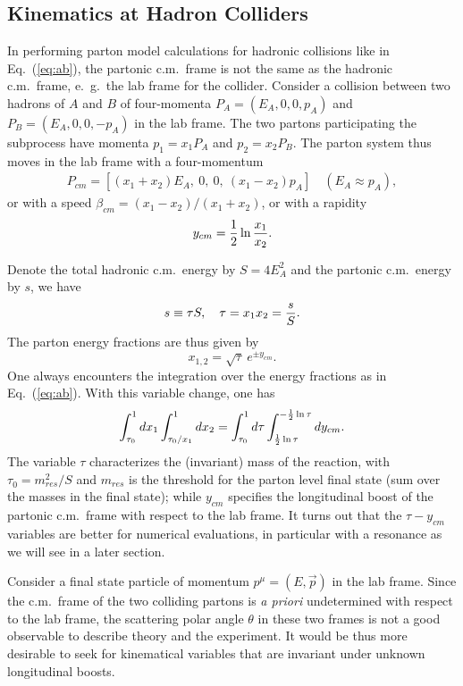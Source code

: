 \documentclass[prd,aps,floats,preprintnumbers,preprint,superscriptaddress,floatfix,nofootinbib]{revtex4}
\def\be{\begin{equation}}
\def\ee{\end{equation}}
\def\bea{\begin{eqnarray}}
\def\eea{\end{eqnarray}}
\begin{document}
\subsection{Kinematics at Hadron Colliders}

In performing parton model calculations for hadronic collisions like in 
Eq.~(\ref{eq:ab}), the partonic c.m.~frame is not the same as the hadronic
c.m.~frame, {e.~g.}~the lab frame for the collider. 
Consider a collision between two hadrons of $A$ and $B$
of four-momenta $P_A=(E_A^{},0,0,p_A^{})$ and $P_B=(E_A^{},0,0,-p_A^{})$ 
in the lab frame. The two partons participating 
the subprocess have momenta $p_1=x_1 P_A^{}$ and $p_2=x_2 P_B^{}$.
The parton system thus moves in the lab frame with a four-momentum 
\bea
P_{cm}=[(x_1+x_2)E_A^{},\ 0,\ 0,\  (x_1-x_2)p_A^{} ] \quad (E_A\approx p_A^{}) ,
\eea
or with a speed $\beta_{cm} = (x_1-x_2) / (x_1+x_2)$, or with a rapidity 
\be
y_{cm} = {1\over 2} \ln {x_1 \over x_2}.
\label{eq:rapcm}
\ee

Denote the total hadronic c.m.~energy by $S=4E_A^2$ and the partonic c.m.~energy
by $s$, we have
\be
s \equiv \tau S,\quad \tau = x_1 x_2 = {s\over S}.
\ee
The parton energy fractions are thus given by
\be
x_{1,2}^{} = \sqrt\tau\ e^{\pm y^{}_{cm}}.
\ee
One always encounters the integration over the energy fractions
as in Eq.~(\ref{eq:ab}). With this variable change, one has
\be
\int_{\tau_0}^1 dx_1 \int_{\tau_0/x_1}^1 dx_2 = \int_{\tau_0}^1 d\tau
 \int_{{1\over 2}\ln\tau}^{-{1\over 2}\ln\tau} dy_{cm}.
\ee
The variable $\tau$ characterizes the (invariant) mass of the reaction, 
with $\tau^{}_0=m^2_{res}/S$ and $m_{res}$ is the threshold for the parton level
final state (sum over the masses in the final state); while $y_{cm}$ specifies the
longitudinal boost of the partonic c.m.~frame with respect to the lab frame.
It turns out that the $\tau - y_{cm}$ variables are
better for numerical evaluations, in particular with a resonance as we will
see in a later section.

Consider a final state particle of momentum $p^\mu = (E,\vec p)$
in the lab frame. 
Since the c.m.~frame of the two colliding partons is {\it a priori} 
undetermined with respect to the lab frame, 
the scattering polar angle  $\theta$ in these two frames is not
a good observable to describe theory and the experiment.
It would be thus more desirable to seek for kinematical variables
that are invariant under unknown longitudinal boosts.
\end{document}

